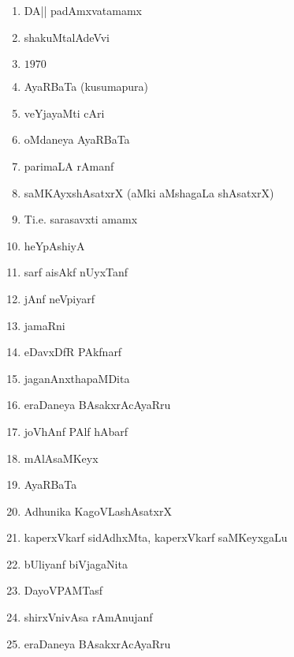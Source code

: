 \begin{enumerate}
\item DA|| padAmxvatamamx

\item shakuMtalAdeVvi

\item $1970$

\item AyaRBaTa (kusumapura)

\item veYjayaMti cAri

\item oMdaneya AyaRBaTa

\item parimaLA rAmanf

\item saMKAyxshAsatxrX (aMki aMshagaLa shAsatxrX)

\item Ti.e. sarasavxti amamx 

\item heYpAshiyA

\item sarf aisAkf nUyxTanf

\item jAnf neVpiyarf

\item jamaRni

\item eDavxDfR PAkfnarf

\item jaganAnxthapaMDita

\item eraDaneya BAsakxrAcAyaRru

\item joVhAnf PAlf hAbarf

\item mAlAsaMKeyx

\item AyaRBaTa

\item Adhunika KagoVLashAsatxrX

\item kaperxVkarf sidAdhxMta, kaperxVkarf saMKeyxgaLu

\item bUliyanf biVjagaNita

\item DayoVPAMTasf

\item shirxVnivAsa rAmAnujanf

\item eraDaneya BAsakxrAcAyaRru


\end{enumerate}
